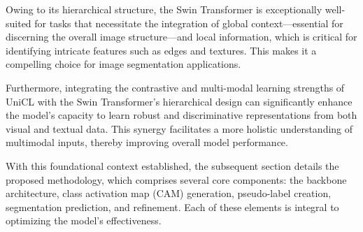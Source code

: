 Owing to its hierarchical structure, the Swin Transformer is exceptionally well-suited for tasks that necessitate the integration of global context—essential for discerning the overall image structure—and local information, which is critical for identifying intricate features such as edges and textures. This makes it a compelling choice for image segmentation applications.

Furthermore, integrating the contrastive and multi-modal learning strengths of UniCL with the Swin Transformer's hierarchical design can significantly enhance the model's capacity to learn robust and discriminative representations from both visual and textual data. This synergy facilitates a more holistic understanding of multimodal inputs, thereby improving overall model performance.

With this foundational context established, the subsequent section details the proposed methodology, which comprises several core components: the backbone architecture, class activation map (CAM) generation, pseudo-label creation, segmentation prediction, and refinement. Each of these elements is integral to optimizing the model's effectiveness.


